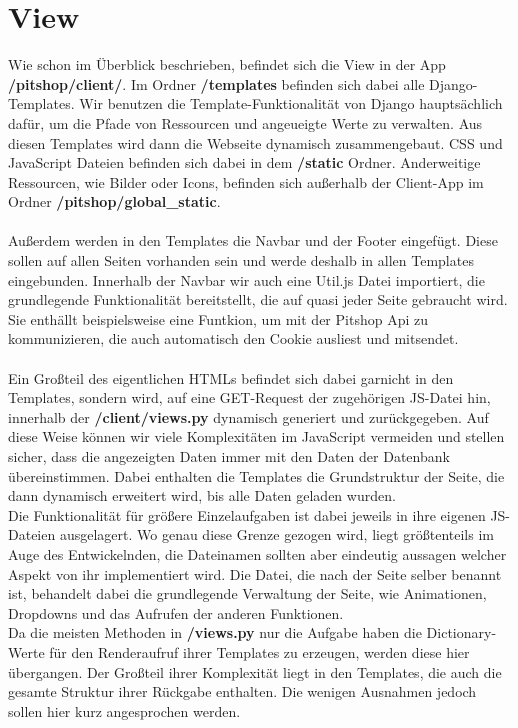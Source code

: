 \documentclass[12pt]{article}
\newcommand{\dir}[1]{\textbf{/#1}}
\begin{document}
\section{View}
Wie schon im Überblick beschrieben, befindet sich die View in der App \dir{pitshop/client/}. Im Ordner \dir{templates} befinden sich dabei alle Django-Templates.
Wir benutzen die Template-Funktionalität von Django hauptsächlich dafür, um die Pfade von Ressourcen und angeueigte Werte zu verwalten. Aus diesen Templates wird dann die Webseite dynamisch zusammengebaut. CSS und JavaScript Dateien befinden sich
dabei in dem \dir{static} Ordner. Anderweitige Ressourcen, wie Bilder oder Icons, befinden sich außerhalb der Client-App im Ordner \dir{pitshop/global_static}. 
\\ \\
Außerdem werden in den Templates die Navbar und der Footer eingefügt. Diese sollen auf allen Seiten vorhanden sein und werde deshalb in allen Templates eingebunden.
Innerhalb der Navbar wir auch eine Util.js Datei importiert, die grundlegende Funktionalität bereitstellt, die auf quasi jeder Seite gebraucht wird.
Sie enthällt beispielsweise eine Funtkion, um mit der Pitshop Api zu kommunizieren, die auch automatisch den Cookie ausliest und mitsendet.
\\ \\
Ein Großteil des eigentlichen HTMLs befindet sich dabei garnicht in den Templates, sondern wird, auf eine GET-Request der zugehörigen JS-Datei hin, innerhalb der \dir{client/views.py} dynamisch generiert und zurückgegeben.
Auf diese Weise können wir viele Komplexitäten im JavaScript vermeiden und stellen sicher, dass die angezeigten Daten immer mit den Daten der Datenbank übereinstimmen.
Dabei enthalten die Templates die Grundstruktur der Seite, die dann dynamisch erweitert wird, bis alle Daten geladen wurden.
\\
Die Funktionalität für größere Einzelaufgaben ist dabei jeweils in ihre eigenen JS-Dateien ausgelagert. Wo genau diese Grenze gezogen wird, liegt größtenteils im Auge des Entwickelnden, die Dateinamen sollten aber eindeutig
aussagen welcher Aspekt von ihr implementiert wird. Die Datei, die nach der Seite selber benannt ist, behandelt dabei die grundlegende Verwaltung der Seite, wie Animationen, Dropdowns und das Aufrufen der anderen Funktionen.
\\
Da die meisten Methoden in \dir{views.py} nur die Aufgabe haben die Dictionary-Werte für den Renderaufruf ihrer Templates zu erzeugen, werden diese hier übergangen. Der Großteil ihrer Komplexität liegt in den 
Templates, die auch die gesamte Struktur ihrer Rückgabe enthalten. 
Die wenigen Ausnahmen jedoch sollen hier kurz angesprochen werden.
\end{document}
